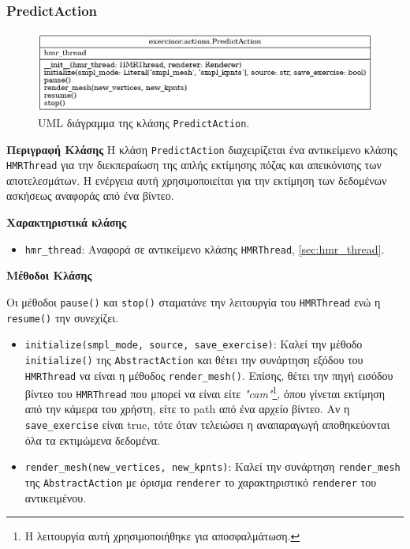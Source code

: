 \subsubsection{PredictAction}

\begin{figure}[H]
	\centering
	\includegraphics[scale=0.5]{images/chapter5/predict_action_uml.png}
	\caption{UML διάγραμμα της κλάσης \texttt{PredictAction}.}
	\label{fig:predict_action}
\end{figure}

\noindent\textbf{Περιγραφή Κλάσης}
Η κλάση \texttt{PredictAction} διαχειρίζεται ένα αντικείμενο κλάσης \texttt{HMRThread} για την διεκπεραίωση της απλής εκτίμησης πόζας και απεικόνισης των αποτελεσμάτων. Η ενέργεια αυτή χρησιμοποιείται για την εκτίμηση των δεδομένων ασκήσεως αναφοράς από ένα βίντεο.

\noindent\textbf{Χαρακτηριστικά κλάσης}
\begin{itemize}
	\item \texttt{hmr\_thread}: Αναφορά σε αντικείμενο κλάσης \texttt{HMRThread}, \ref{sec:hmr_thread}.
\end{itemize}

\noindent\textbf{Μέθοδοι Κλάσης}

Οι μέθοδοι \texttt{pause()} και \texttt{stop()} σταματάνε την λειτουργία του \texttt{HMRThread} ενώ η \texttt{resume()} την συνεχίζει.
\begin{itemize}
	\item \texttt{initialize(smpl\_mode, source, save\_exercise)}: Καλεί την μέθοδο \texttt{initialize()} της \texttt{AbstractAction} και θέτει την συνάρτηση εξόδου του \texttt{HMRThread} να είναι η μέθοδος \texttt{render\_mesh()}. Επίσης, θέτει την πηγή εισόδου βίντεο του \texttt{HMRThread} που μπορεί να είναι είτε \textsl{"cam"}\footnote{Η λειτουργία αυτή χρησιμοποιήθηκε για αποσφαλμάτωση.}, όπου γίνεται εκτίμηση από την κάμερα του χρήστη, είτε το path από ένα αρχείο βίντεο. Αν η \texttt{save\_exercise} είναι true, τότε όταν τελειώσει η αναπαραγωγή αποθηκεύονται όλα τα εκτιμώμενα δεδομένα.
	\item \texttt{render\_mesh(new\_vertices, new\_kpnts)}: Καλεί την συνάρτηση \texttt{render\_mesh} της \texttt{AbstractAction} με όρισμα \texttt{renderer} το χαρακτηριστικό \texttt{renderer} του αντικειμένου.
\end{itemize}


